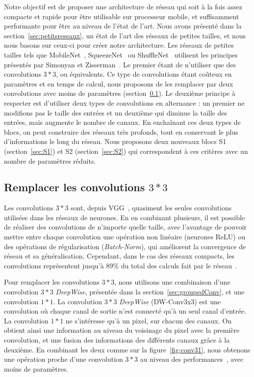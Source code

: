 Notre objectif est de proposer une architecture de réseau qui soit à la fois assez compacte et rapide pour être utilisable sur processeur mobile, et suffisamment performante pour être au niveau de l'état de l'art. 
Nous avons présenté dans la section~\ref{sec:petitsreseaux}, un état de l'art des réseaux de petites tailles, et nous nous basons sur ceux-ci pour créer notre architecture.
Les réseaux de petites tailles tels que MobileNet~\cite{howard2017mobilenets}, SqueezeNet~\cite{iandola2016squeezenet} ou ShuffleNet~\cite{zhang2017shufflenet} utilisent les principes présentés par Simonyan et Zisserman~\cite{simonyan2014very}.
Le premier étant de n'utiliser que des convolutions $3*3$, ou équivalents.
Ce type de convolutions étant coûteux en paramètres et en temps de calcul, nous proposons de les remplacer par deux convolutions avec moins de paramètres (section~\ref{sec:remplacer}).
Le deuxième principe à respecter est d'utiliser deux types de convolutions en alternance : un premier ne modifions pas le taille des entrées et un deuxième qui diminue la taille des entrées, mais augmente le nombre de canaux.
En enchaînant ces deux types de blocs, on peut construire des réseaux très profonds, tout en conservant le plus d'informations le long du réseau.
Nous proposons deux nouveaux blocs S1 (section~\ref{sec:S1}) et S2 (section~\ref{sec:S2}) qui correspondent à ces critères avec un nombre de paramètres réduits.



\subsection{Remplacer les convolutions $3*3$}
\label{sec:remplacer}

Les convolutions $3*3$ sont, depuis VGG~\cite{simonyan2014very}, quasiment les seules convolutions utilisées dans les réseaux de neurones.
En en combinant plusieurs, il est possible de réaliser des convolutions de n'importe quelle taille, avec l'avantage de pouvoir mettre entre chaque convolution une opération non linéaire (neurones ReLU) ou des opérations de régularisation (\textit{Batch-Norm}), qui améliorent la convergence de réseau et sa généralisation.
Cependant, dans le cas des réseaux compacts, les convolutions représentent jusqu'à 89\% du total des calculs fait par le réseau~\cite{ma2018shufflenet}.

Pour remplacer les convolutions $3*3$, nous utilisons une combinaison d'une convolution $3*3$ \textit{DeepWise}, présentée dans la section~\ref{sec:groupedConv}, et une convolution $1*1$.
La convolution $3*3$ \textit{DeepWise} (DW-Conv3x3) est une convolution où chaque canal de sortie n'est connecté qu'à un seul canal d'entrée.
La convolution $1*1$ ne s'intéresse qu'à un pixel, sur chacun des canaux.
On obtient ainsi une information au niveau du voisinage du pixel avec la première convolution, et une fusion des informations des différents canaux grâce à la deuxième.
En combinant les deux comme sur la figure~\ref{fig:conv31}, nous obtenons une opération proche d'une convolution $3*3$ au niveau des performances~\cite{howard2017mobilenets}, avec moins de paramètres.


